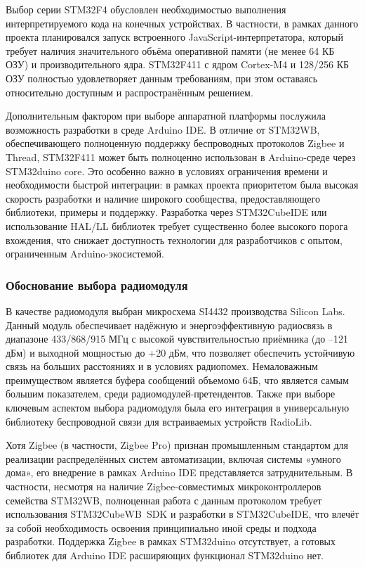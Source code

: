 \documentclass[14pt,a4paper]{extarticle}
\begin{document}
Выбор серии STM32F4 обусловлен необходимостью выполнения интерпретируемого кода на конечных устройствах. В частности, в рамках данного проекта планировался запуск встроенного
JavaScript-интерпретатора, который требует наличия значительного объёма оперативной памяти (не менее 64 КБ ОЗУ) и производительного ядра. STM32F411 с ядром Cortex-M4 и 128/256 КБ
ОЗУ полностью удовлетворяет данным требованиям, при этом оставаясь относительно доступным и распространённым решением.

Дополнительным фактором при выборе аппаратной платформы послужила возможность разработки в среде Arduino IDE. В отличие от STM32WB, обеспечивающего полноценную поддержку беспроводных
протоколов Zigbee и Thread, STM32F411 может быть полноценно использован в Arduino-среде через STM32duino core. Это особенно важно в условиях ограничения времени и необходимости
быстрой интеграции: в рамках проекта приоритетом была высокая скорость разработки и наличие широкого сообщества, предоставляющего библиотеки, примеры и поддержку. Разработка через
STM32CubeIDE или использование HAL/LL библиотек требует существенно более высокого порога вхождения, что снижает доступность технологии для разработчиков с опытом, ограниченным
Arduino-экосистемой.

\subsubsection{Обоснование выбора радиомодуля}

В качестве радиомодуля выбран микросхема SI4432 производства Silicon Labs. Данный модуль обеспечивает надёжную и энергоэффективную радиосвязь в диапазоне 433/868/915 МГц с высокой
чувствительностью приёмника (до –121 дБм) и выходной мощностью до +20 дБм, что позволяет обеспечить устойчивую связь на больших расстояниях и в условиях радиопомех. Немаловажным
преимуществом является буфера сообщений объемомо 64Б, что является самым большим показателем, среди радиомодулей-претендентов. Также при выборе ключевым аспектом выбора радиомодуля
была его интеграция в универсальную библиотеку беспроводной связи для встраиваемых устройств RadioLib.

Хотя Zigbee (в частности, Zigbee Pro) признан промышленным стандартом для реализации распределённых систем автоматизации, включая системы «умного дома», его внедрение в рамках Arduino
IDE представляется затруднительным. В частности, несмотря на наличие Zigbee-совместимых микроконтроллеров семейства STM32WB, полноценная работа с данным протоколом требует
использования STM32CubeWB~SDK и разработки в STM32CubeIDE, что влечёт за собой необходимость освоения принципиально иной среды и подхода разработки. Поддержка Zigbee в
рамках STM32duino отсутствует, а готовых библиотек для Arduino IDE расширяющих функционал STM32duino нет.
\end{document}
